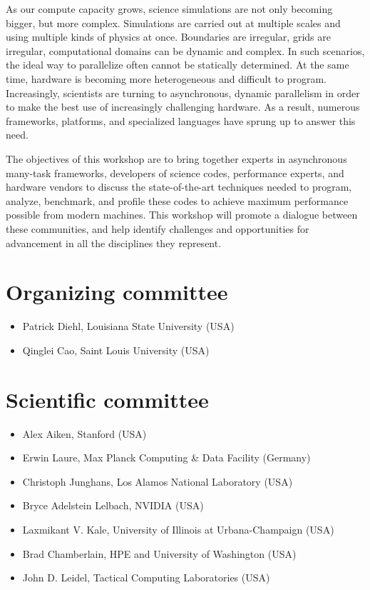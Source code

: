 As our compute capacity grows, science simulations are not only becoming bigger, but more complex. Simulations are carried out at multiple scales and using multiple kinds of physics at once. Boundaries are irregular, grids are irregular, computational domains can be dynamic and complex. In such scenarios, the ideal way to parallelize often cannot be statically determined. At the same time, hardware is becoming more heterogeneous and difficult to program. Increasingly, scientists are turning to asynchronous, dynamic parallelism in order to make the best use of increasingly challenging hardware. As a result, numerous frameworks, platforms, and specialized languages have sprung up to answer this need.

The objectives of this workshop are to bring together experts in asynchronous many-task frameworks, developers of science codes, performance experts, and hardware vendors to discuss the state-of-the-art techniques needed to program, analyze, benchmark, and profile these codes to achieve maximum performance possible from modern machines. This workshop will promote a dialogue between these communities, and help identify challenges and opportunities for advancement in all the disciplines they represent.

\section*{Organizing committee}
\begin{itemize}
\item Patrick Diehl, Louisiana State University (USA)
\item Qinglei Cao, Saint Louis University (USA)
\end{itemize}

\section*{Scientific committee}
\begin{itemize}
\item Alex Aiken, Stanford (USA)
\item Erwin Laure, Max Planck Computing \& Data Facility (Germany)
\item Christoph Junghans, Los Alamos National Laboratory (USA)
\item Bryce Adelstein Lelbach, NVIDIA (USA)
\item Laxmikant V. Kale, University of Illinois at Urbana-Champaign (USA)
\item Brad Chamberlain, HPE and University of Washington (USA)
\item John D. Leidel, Tactical Computing Laboratories (USA) 
\end{itemize}

